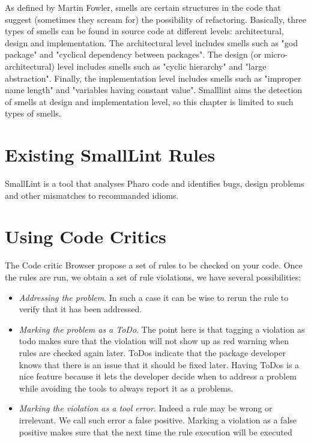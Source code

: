 \documentclass[a4paper,10pt,twoside]{book}
\begin{document}
As defined by Martin Fowler, smells are certain structures in the code that suggest (sometimes they scream for) the possibility of refactoring.
Basically, three types of smells can be found in source code at different levels: architectural, design and implementation. The architectural level includes smells such as "god package" and "cyclical dependency between packages". The design (or micro-architectural) level includes smells such as "cyclic hierarchy" and "large abstraction". Finally, the implementation level includes smells such as "improper name length" and "variables having constant value". Smalllint aims the detection of smells at design and implementation level, so this chapter is limited to such types of smells.



\section{Existing SmallLint Rules}\label{existingRules}
SmallLint is a tool that analyses Pharo code and identifies bugs, design problems and other mismatches to recommanded idioms. 




\section{Using Code Critics}
The Code critic Browser propose a set of rules to be checked on your code. 
Once the rules are run, we obtain a set of rule violations, we have several possibilities:

\begin{itemize}
\item \emph{Addressing the problem}. In such a case it can be wise to rerun the rule to verify that it has been addressed.

\item \emph{Marking the problem as a ToDo}. The point here is that tagging a violation as todo makes sure that the violation will not show up as red warning when rules are checked again later. ToDos indicate that the package developer knows that there is an issue that it should be fixed later. Having ToDos is a nice feature because it lets the developer decide when to address a problem while avoiding the tools to always report it as a problems. 

\item \emph{Marking the violation as a tool error}. Indeed a rule may be wrong or irrelevant. We call such error a false positive. Marking a violation as a false positive makes sure that the next time the rule execution will be executed
\end{itemize}
\end{document}

